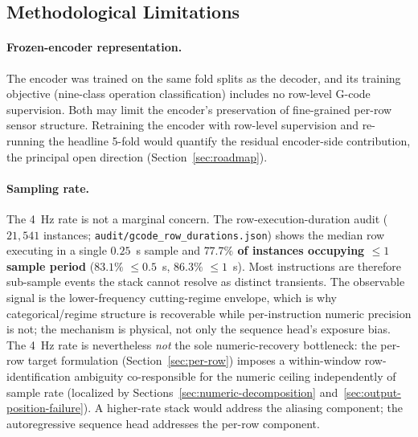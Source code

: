 \documentclass[sensors,article,submit,moreauthors,pdftex]{Definitions/mdpi}
\begin{document}
\subsection{Methodological Limitations}
\label{sec:lim-method}

\paragraph{Frozen-encoder representation.} The encoder was trained on the same fold splits as the decoder, and its training objective (nine-class operation classification) includes no row-level G-code supervision. Both may limit the encoder's preservation of fine-grained per-row sensor structure. Retraining the encoder with row-level supervision and re-running the headline 5-fold would quantify the residual encoder-side contribution, the principal open direction (Section~\ref{sec:roadmap}).

\paragraph{Sampling rate.} The 4~Hz rate is not a marginal concern. The row-execution-duration audit ($21{,}541$ instances; \texttt{audit/gcode\_row\_durations.json}) shows the median row executing in a single $0.25$~s sample and \textbf{$77.7\%$ of instances occupying $\le\!1$ sample period} ($83.1\%$ $\le\!0.5$~s, $86.3\%$ $\le\!1$~s). Most instructions are therefore sub-sample events the stack cannot resolve as distinct transients. The observable signal is the lower-frequency cutting-regime envelope, which is why categorical/regime structure is recoverable while per-instruction numeric precision is not; the mechanism is physical, not only the sequence head's exposure bias. The 4~Hz rate is nevertheless \emph{not} the sole numeric-recovery bottleneck: the per-row target formulation (Section~\ref{sec:per-row}) imposes a within-window row-identification ambiguity co-responsible for the numeric ceiling independently of sample rate (localized by Sections~\ref{sec:numeric-decomposition} and~\ref{sec:output-position-failure}). A higher-rate stack would address the aliasing component; the autoregressive sequence head addresses the per-row component.
\end{document}
